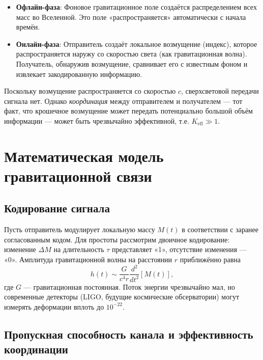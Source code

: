 \documentclass[12pt,a4paper]{article}
\newcommand{\Keff}{K_{\mathrm{eff}}}
\begin{document}
	\begin{itemize}
		\item \textbf{Офлайн-фаза}: Фоновое гравитационное поле создаётся распределением всех масс во Вселенной. Это поле «распространяется» автоматически с начала времён.
		\item \textbf{Онлайн-фаза}: Отправитель создаёт локальное возмущение (индекс), которое распространяется наружу со скоростью света (как гравитационная волна). Получатель, обнаружив возмущение, сравнивает его с известным фоном и извлекает закодированную информацию.
	\end{itemize}
	
	Поскольку возмущение распространяется со скоростью \(c\), сверхсветовой передачи сигнала нет. Однако \emph{координация} между отправителем и получателем — тот факт, что крошечное возмущение может передать потенциально большой объём информации — может быть чрезвычайно эффективной, т.е. \(\Keff \gg 1\).
	
	\section{Математическая модель гравитационной связи}
	\label{sec:model}
	
	\subsection{Кодирование сигнала}
	
	Пусть отправитель модулирует локальную массу \(M(t)\) в соответствии с заранее согласованным кодом. Для простоты рассмотрим двоичное кодирование: изменение \(\Delta M\) на длительность \(\tau\) представляет «1», отсутствие изменения — «0». Амплитуда гравитационной волны на расстоянии \(r\) приближённо равна
	\begin{equation}
		h(t) \sim \frac{G}{c^4 r} \frac{d^2}{dt^2} \left[ M(t) \right],
	\end{equation}
	где \(G\) — гравитационная постоянная. Поток энергии чрезвычайно мал, но современные детекторы (LIGO, будущие космические обсерватории) могут измерять деформации вплоть до \(10^{-22}\).
	
	\subsection{Пропускная способность канала и эффективность координации}
	
\end{document}
